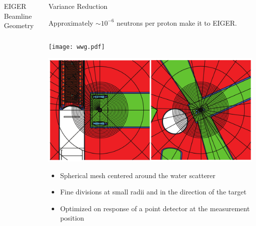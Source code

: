 \documentclass[final,t]{beamer}
\begin{document}
\begin{frame}{}
\begin{columns}[t]
\begin{column}{.3\linewidth}
\begin{block}{EIGER Beamline Geometry}
\begin{columns}[T]
\begin{column}{.25\linewidth}
        \end{column}
      \end{columns}
      
      \end{block}


      \end{column}



    \begin{column}{.3\linewidth}

      \begin{block}{Variance Reduction}

      \begin{center} Approximately $\sim 10^{-6}$ neutrons per proton make it to EIGER. \end{center}

      \begin{columns}

      \begin{column}{0.5\linewidth}

      \begin{center}
      \texttt{[image: wwg.pdf]}

      \includegraphics*[width=\linewidth]{wwg_mesh.pdf}
      \end{center}

      \begin{itemize}
      \item Spherical mesh centered around the water scatterer 
      \item Fine divisions at small radii and in the direction of the target 
      \item Optimized on response of a point detector at the measurement position
      \end{itemize}


\end{column}
\end{columns}
\end{block}
\end{column}
\end{columns}
\end{frame}
\end{document}
